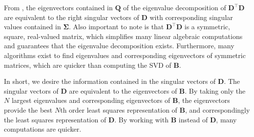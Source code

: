 From , the eigenvectors contained in 
$\mathbf{Q}$ of the eigenvalue decomposition of $\mathbf{D}^{\intercal}\mathbf{D}$ are 
equivalent to the right
singular vectors of $\mathbf{D}$ with corresponding singular values contained in 
$\mathbf{\Sigma}$. Also important to note is that 
$\mathbf{D}^{\intercal}\mathbf{D}$ is a symmetric, square, real-valued matrix, 
which simplifies many linear algebraic computations and guarantees that the 
eigenvalue decomposition exists.  Furthermore, many algorithms exist to find eigenvalues and 
corresponding eigenvectors of symmetric matrices, which are quicker than computing the SVD of 
$\mathbf{B}$.

In short, we desire the information contained in the singular vectors of 
$\mathbf{D}$.  The singular vectors of $\mathbf{D}$ are equivalent to the 
eigenvectors of $\mathbf{B}$.  By taking only the $N$ largest eigenvalues and 
corresponding eigenvectors  of $\mathbf{B}$, the eigenvectors 
provide the best $N$th order least squares representation of $\mathbf{B}$, and 
correspondingly the least squares representation of $\mathbf{D}$.  By working 
with $\mathbf{B}$ instead of $\mathbf{D}$, many computations are quicker.

